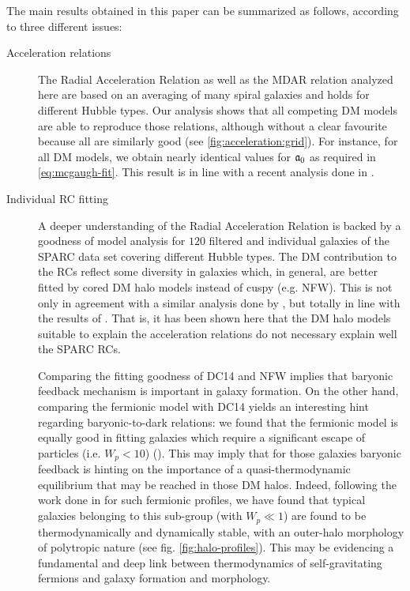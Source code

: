 The main results obtained in this paper can be summarized as follows, according to three different issues:
\begin{description}
\item[Acceleration relations] The Radial Acceleration Relation as well as the MDAR relation analyzed here are based on an averaging of many spiral galaxies and holds for different Hubble types. Our analysis shows that all competing DM models are able to reproduce those relations, although without a clear favourite because all are similarly good (see \cref{fig:acceleration:grid}). For instance, for all DM models, we obtain nearly identical values for $\mathfrak{a}_0$ as required in \cref{eq:mcgaugh-fit}. This result is in line with a recent analysis done in \citet{2020JCAP...06..027K}. 

\item[Individual RC fitting] A deeper understanding of the Radial Acceleration Relation  is backed by a goodness of model analysis for $120$ filtered and individual galaxies of the SPARC data set covering different Hubble types. The DM contribution to the RCs reflect some diversity in galaxies which, in general, are better fitted by cored DM halo models instead of cuspy (e.g. NFW). This is not only in agreement with a similar analysis done by \citet{2020ApJS..247...31L}, but totally in line with the results of \citet{2020JCAP...06..027K}. That is, it has been shown here that the DM halo models suitable to explain the acceleration relations do not necessary explain well the SPARC RCs.

Comparing the fitting goodness of DC14 and NFW implies that baryonic feedback mechanism is important in galaxy formation. On the other hand, comparing the fermionic model with DC14  yields an interesting hint regarding baryonic-to-dark relations: we found that the fermionic model is equally good in fitting galaxies which require a significant escape of particles (i.e. $W_p < 10$) (). This may imply that for those galaxies baryonic feedback is  hinting on the importance of a quasi-thermodynamic equilibrium that may be reached in those DM halos.  Indeed, following the work done in \cite{2021MNRAS.502.4227A} for such fermionic profiles, we have found that typical galaxies belonging to this sub-group (with $W_p \ll 1$) are found to be thermodynamically and dynamically stable, with an outer-halo morphology of polytropic nature (see fig. \ref{fig:halo-profiles}). This may be evidencing a fundamental and deep link between thermodynamics of self-gravitating fermions and galaxy formation and morphology. 


\end{description}

